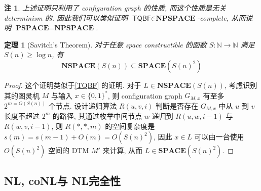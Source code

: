 \documentclass[8pt]{article}
\theoremstyle{compact}
\newtheorem{theorem}{定理}[section]
\newtheorem{remark}{注}[section]
\def\ge{\geqslant}
\def\SPACE{\textbf{SPACE}}
\def\NSPACE{\textbf{NSPACE}}
\def\PSPACE{\textbf{PSPACE}}
\def\NPSPACE{\textbf{NPSPACE}}
\def\NL{\textbf{NL}}
\def\coNL{\textbf{coNL}}
\begin{document}
\begin{remark}
	上述证明只利用了 configuration graph 的性质, 而这个性质是无关 determinism 的. 因此我们可以类似证明 $\textsf{TQBF} \in \NPSPACE$-complete, 从而说明 $\PSPACE = \NPSPACE$.
\end{remark}
\begin{theorem}[Savitch's Theorem]
	对于任意 space constructible 的函数 $S: \mathbb N \to \mathbb N$ 满足 $S(n) \ge \log n$, 有 $$\NSPACE(S(n)) \subseteq \SPACE(S(n)^2)$$
\end{theorem}
\begin{proof}
	这个证明类似于\cref{TQBF} 的证明. 对于 $L \in \NSPACE(S(n))$, 考虑识别其的图灵机 $M$ 与输入 $x \in \{0, 1\}^*$, 则 configuration graph $G_{M, x}$ 有至多 $2^{m = O(S(n))}$ 个节点. 设计递归算法 $R(u, v, i)$ 判断是否存在 $G_{M, x}$ 中从 $u$ 到 $v$ 长度不超过 $2^m$ 的路径, 其通过枚举中间节点 $w$ 递归到 $R(u, w, i - 1)$ 与 $R(w, v, i - 1)$, 则 $R(*, *, m)$ 的空间复杂度是 $s(m) = s(m - 1) + O(m) = O(S(n)^2)$, 因此 $x \in L$ 可以由一台使用 $O(S(n)^2)$ 空间的 DTM $M'$ 来计算, 从而 $L \in \SPACE(S(n)^2)$.
\end{proof}


\subsection{\NL, \coNL 与 \NL 完全性}
\end{document}
